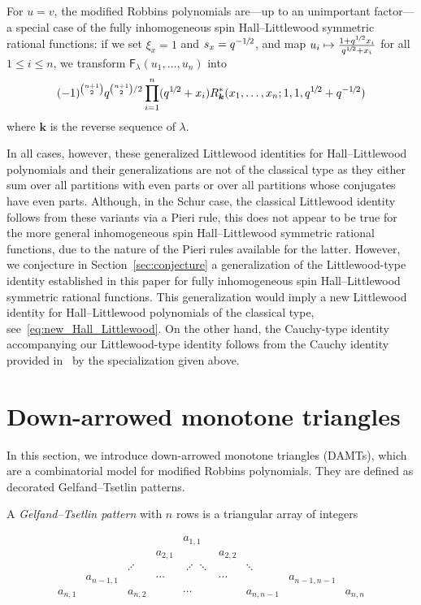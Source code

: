 \documentclass[ALCO, Unicode]{cedram}
\newcommand{\half}{1\mkern-2mu/\mkern-2mu2}
\newcommand{\deff}[1]{\emph{#1}}
\newcommand{\F}{\mathsf{F}}
\newcommand{\boldk}{\boldsymbol{k}}
\begin{document}
	For $u=v$, the modified Robbins polynomials are---up to an unimportant factor---a special case of the fully inhomogeneous spin Hall--Littlewood symmetric rational functions: if we set $\xi_x=1$ and $s_x=q^{-\half}$,
	and map $u_i \mapsto \frac{1 + q^{\half} x_i}{q^{\half} + x_i}$ for all $1 \le i \le n$, we transform $\F_{\lambda}(u_1,\dots,u_n)$ into 
	\begin{equation*}
		(-1)^{\binom{n+1}{2}}
		q^{\binom{n+1}{2}/2} \prod_{i=1}^{n} (q^{\half} + x_i) R_{\boldk}^{\ast}(x_{1},\ldots,x_{n};1,1,q^{\half}+q^{-\half})\end{equation*}
	where $\boldk$ is the reverse sequence of $\lambda$.
	
	In all cases, however, these generalized Littlewood identities for Hall--Littlewood polynomials and their generalizations are not of the classical type as they either sum over all partitions with even parts or over all partitions whose conjugates have even parts. Although, in the Schur case, the classical Littlewood identity follows from these variants via a Pieri rule, this does not appear to be true for the more general inhomogeneous spin Hall--Littlewood symmetric rational functions, due to the nature of the Pieri rules available for the latter. However, we conjecture in Section~\ref{sec:conjecture} a generalization of the Littlewood-type identity established in this paper for fully inhomogeneous spin Hall--Littlewood symmetric rational functions. This generalization would imply a new Littlewood identity for Hall--Littlewood polynomials of the classical type, see~\eqref{eq:new_Hall_Littlewood}. On the other hand, the Cauchy-type identity accompanying our Littlewood-type identity follows from the Cauchy identity provided in~\cite{P21} by the specialization given above.
	
	\section{Down-arrowed monotone triangles}
	\label{sec:down}
	
	In this section, we introduce down-arrowed monotone triangles (DAMTs), which are a combinatorial model for modified Robbins polynomials. They are defined as decorated Gelfand--Tsetlin patterns.
	
	A \deff{Gelfand--Tsetlin pattern} with $n$ rows is a triangular array of integers
	
	\begin{equation*}
		\begin{array}{ccccccccc}
			&&&& a_{1,1} \\
			&&& a_{2,1} && a_{2,2} \\
			&& \iddots && \iddots\ddots &&\ddots\\
			&a_{n-1,1} && \cdots && \cdots && a_{n-1,n-1} \\
			a_{n,1} && a_{n,2} && \cdots && a_{n,n-1} && a_{n,n}
		\end{array}
	\end{equation*}
	
\end{document}
